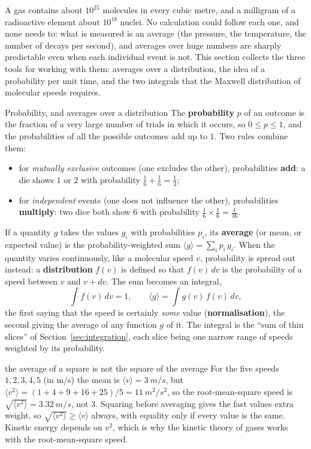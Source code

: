 A gas contains about $10^{25}$ molecules in every cubic metre, and a milligram of a radioactive element
about $10^{18}$ nuclei. No calculation could follow each one, and none needs to: what is measured is an
average (the pressure, the temperature, the number of decays per second), and averages over huge numbers
are sharply predictable even when each individual event is not. This section collects the three tools
for working with them: averages over a distribution, the idea of a probability per unit time, and the
two integrals that the Maxwell distribution of molecular speeds requires.

\begin{defbox}{Probability, and averages over a distribution}
The \textbf{probability} $p$ of an outcome is the fraction of a very large number of trials in which it
occurs, so $0\le p\le1$, and the probabilities of all the possible outcomes add up to $1$. Two rules
combine them:
\begin{itemize}
\item for \emph{mutually exclusive} outcomes (one excludes the other), probabilities \textbf{add}: a die
      shows $1$ or $2$ with probability $\tfrac16+\tfrac16=\tfrac13$;
\item for \emph{independent} events (one does not influence the other), probabilities \textbf{multiply}:
      two dice both show $6$ with probability $\tfrac16\times\tfrac16=\tfrac1{36}$.
\end{itemize}
If a quantity $g$ takes the values $g_i$ with probabilities $p_i$, its \textbf{average} (or mean, or
expected value) is the probability-weighted sum $\langle g\rangle=\sum_i p_i\,g_i$. When the quantity
varies continuously, like a molecular speed $v$, probability is spread out instead: a
\textbf{distribution} $f(v)$ is defined so that $f(v)\,dv$ is the probability of a speed between $v$ and
$v+dv$. The sum becomes an integral,
\[
\int f(v)\,dv=1,\qquad \langle g\rangle=\int g(v)\,f(v)\,dv ,
\]
the first saying that the speed is certainly \emph{some} value (\textbf{normalisation}), the second
giving the average of any function $g$ of it. The integral is the ``sum of thin slices'' of
Section~\ref{sec:integration}, each slice being one narrow range of speeds weighted by its probability.
\end{defbox}

\begin{trapbox}{the average of a square is not the square of the average}
For the five speeds $1,2,3,4,5$ (in \si{m/s}) the mean is $\langle v\rangle=\SI{3}{m/s}$, but
$\langle v^2\rangle=(1+4+9+16+25)/5=\SI{11}{m^2/s^2}$, so the root-mean-square speed is
$\sqrt{\langle v^2\rangle}=\SI{3.32}{m/s}$, not $3$. Squaring before averaging gives the fast values extra
weight, so $\sqrt{\langle v^2\rangle}\ge\langle v\rangle$ always, with equality only if every value is the
same. Kinetic energy depends on $v^2$, which is why the kinetic theory of gases works with the
root-mean-square speed.
\end{trapbox}

